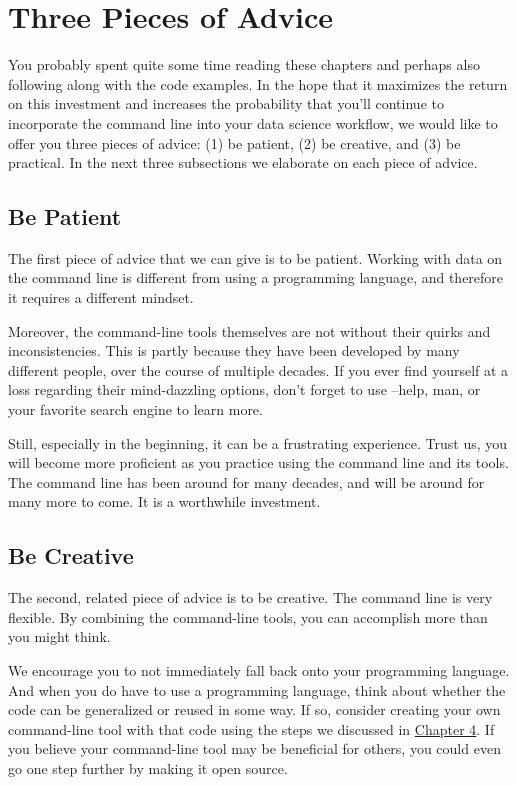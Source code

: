 \documentclass[
]{book}
\theoremstyle{definition}
\theoremstyle{definition}
\theoremstyle{definition}
\theoremstyle{remark}
\begin{document}
\hypertarget{three-pieces-of-advice}{%
\section{Three Pieces of Advice}\label{three-pieces-of-advice}}

You probably spent quite some time reading these chapters and perhaps also following along with the code examples. In the hope that it maximizes the return on this investment and increases the probability that you'll continue to incorporate the command line into your data science workflow, we would like to offer you three pieces of advice: (1) be patient, (2) be creative, and (3) be practical. In the next three subsections we elaborate on each piece of advice.

\hypertarget{be-patient}{%
\subsection{Be Patient}\label{be-patient}}

The first piece of advice that we can give is to be patient. Working with data on the command line is different from using a programming language, and therefore it requires a different mindset.

Moreover, the command-line tools themselves are not without their quirks and inconsistencies. This is partly because they have been developed by many different people, over the course of multiple decades. If you ever find yourself at a loss regarding their mind-dazzling options, don't forget to use --help, man, or your favorite search engine to learn more.

Still, especially in the beginning, it can be a frustrating experience. Trust us, you will become more proficient as you practice using the command line and its tools. The command line has been around for many decades, and will be around for many more to come. It is a worthwhile investment.

\hypertarget{be-creative}{%
\subsection{Be Creative}\label{be-creative}}

The second, related piece of advice is to be creative. The command line is very flexible. By combining the command-line tools, you can accomplish more than you might think.

We encourage you to not immediately fall back onto your programming language. And when you do have to use a programming language, think about whether the code can be generalized or reused in some way. If so, consider creating your own command-line tool with that code using the steps we discussed in \protect\hyperlink{chapter-4-creating-reusable-command-line-tools}{Chapter 4}. If you believe your command-line tool may be beneficial for others, you could even go one step further by making it open source.
\end{document}
